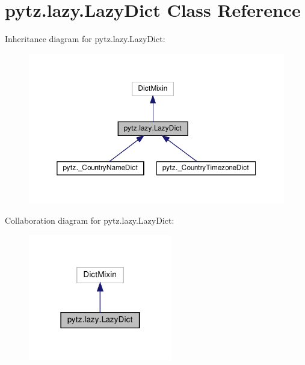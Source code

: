 \hypertarget{classpytz_1_1lazy_1_1LazyDict}{}\section{pytz.\+lazy.\+Lazy\+Dict Class Reference}
\label{classpytz_1_1lazy_1_1LazyDict}


Inheritance diagram for pytz.\+lazy.\+Lazy\+Dict\+:
\nopagebreak
\begin{figure}[H]
\begin{center}
\leavevmode
\includegraphics[width=350pt]{classpytz_1_1lazy_1_1LazyDict__inherit__graph}
\end{center}
\end{figure}


Collaboration diagram for pytz.\+lazy.\+Lazy\+Dict\+:
\nopagebreak
\begin{figure}[H]
\begin{center}
\leavevmode
\includegraphics[width=178pt]{classpytz_1_1lazy_1_1LazyDict__coll__graph}
\end{center}
\end{figure}
